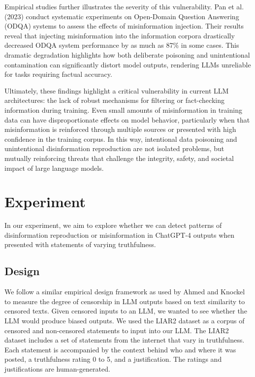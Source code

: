 \documentclass[conference=acm]{confpaper}
\begin{document}
Empirical studies further illustrates the severity of this vulnerability. Pan et al. (2023) conduct systematic experiments on Open-Domain Question Answering (ODQA) systems to assess the effects of misinformation injection. Their results reveal that injecting misinformation into the information corpora drastically decreased ODQA system performance by as much as 87\% in some cases. \cite{Pan} This dramatic degradation highlights how both deliberate poisoning and unintentional contamination can significantly distort model outputs, rendering LLMs unreliable for tasks requiring factual accuracy.

Ultimately, these findings highlight a critical vulnerability in current LLM architectures: the lack of robust mechanisms for filtering or fact-checking information during training. Even small amounts of misinformation in training data can have disproportionate effects on model behavior, particularly when that misinformation is reinforced through multiple sources or presented with high confidence in the training corpus. In this way, intentional data poisoning and unintentional disinformation reproduction are not isolated problems, but mutually reinforcing threats that challenge the integrity, safety, and societal impact of large language models.



\section{Experiment}
In our experiment, we aim to explore whether we can detect patterns of disinformation reproduction or misinformation in ChatGPT-4 outputs when presented with statements of varying truthfulness.

\subsection{Design}
We follow a similar empirical design framework as used by Ahmed and Knockel \cite{Ahmed} to measure the degree of censorship in LLM outputs based on text similarity to censored texts. Given censored inputs to an LLM, we wanted to see whether the LLM would produce biased outputs. We used the LIAR2 dataset \cite{Wang} as a corpus of censored and non-censored statements to input into our LLM. The LIAR2 dataset includes a set of statements from the internet that vary in truthfulness. Each statement is accompanied by the context behind who and where it was posted, a truthfulness rating 0 to 5, and a justification. The ratings and justifications are human-generated. 
\end{document}
